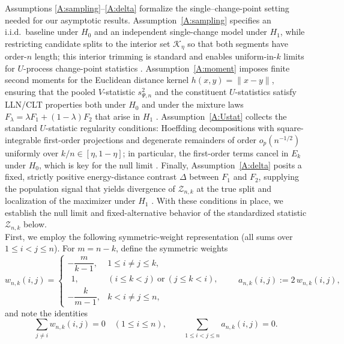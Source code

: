 \documentclass[11pt]{article}
\numberwithin{theorem}{section}
\numberwithin{Lemma}{section}
\numberwithin{Definition}{section}
\begin{document}
Assumptions \ref{A:sampling}–\ref{A:delta} formalize the single–change-point setting needed for our asymptotic results. 
Assumption~\ref{A:sampling} specifies an i.i.d.\ baseline under $H_0$ and an independent single-change model under $H_1$, while restricting candidate splits to the interior set $\mathcal K_\eta$ so that both segments have order-$n$ length; this interior trimming is standard and enables uniform-in-$k$ limits for $U$-process change-point statistics \citep{cs1997,DehlingVukWendler2022}. 
Assumption~\ref{A:moment} imposes finite second moments for the Euclidean distance kernel $h(x,y)=\|x-y\|$, ensuring that the pooled $V$-statistic $s_{\Psi,n}^2$ and the constituent $U$-statistics satisfy LLN/CLT properties both under $H_0$ and under the mixture laws $F_\lambda=\lambda F_1+(1-\lambda)F_2$ that arise in $H_1$ \citep{sze2013,RizzoSzekely2016}. 
Assumption~\ref{A:Ustat} collects the standard $U$-statistic regularity conditions: Hoeffding decompositions with square-integrable first-order projections and degenerate remainders of order $o_p(n^{-1/2})$ uniformly over $k/n\in[\eta,1-\eta]$; in particular, the first-order terms cancel in $E_k$ under $H_0$, which is key for the null limit \citep{hoeff1948,DehlingVukWendler2022}. 
Finally, Assumption~\ref{A:delta} posits a fixed, strictly positive energy-distance contrast $\Delta$ between $F_1$ and $F_2$, supplying the population signal that yields divergence of $\mathcal{Z}_{n,k}$ at the true split and localization of the maximizer under $H_1$ \citep{sze2013}. 
With these conditions in place, we establish the null limit and fixed-alternative behavior of the standardized statistic $\mathcal{Z}_{n,k}$ below.\\


First, we employ the following symmetric-weight representation (all sums over $1\le i<j\le n$). For $m=n-k$, define the symmetric weights
\[
w_{n,k}(i,j)=
\begin{cases}
-\dfrac{m}{k-1}, & 1\le i\ne j\le k,\\[6pt]
\ \ 1, & (i\le k<j)\ \text{or}\ (j\le k<i),\\[6pt]
-\dfrac{k}{m-1}, & k<i\ne j\le n,
\end{cases}
\qquad
a_{n,k}(i,j):=2\,w_{n,k}(i,j),
\]
and note the identities
\begin{equation}\label{eq:rowsums}
\sum_{j\ne i} w_{n,k}(i,j)=0\quad (1\le i\le n),\qquad
\sum_{1\le i<j\le n} a_{n,k}(i,j) = 0.
\end{equation}
\end{document}
